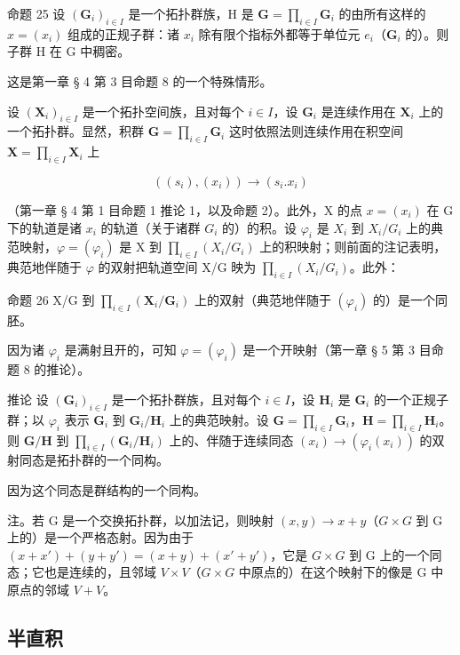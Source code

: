 命题 25 设 \((\mathbf{G}_{i})_{i\in I}\) 是一个拓扑群族，H 是 \(\mathbf{G} = \prod_{i\in I}\mathbf{G}_i\) 的由所有这样的 \(x = (x_{i})\) 组成的正规子群：诸 \(x_{i}\) 除有限个指标外都等于单位元 \(e_i\)（\(\mathbf{G}_i\) 的）。则子群 H 在 G 中稠密。

这是第一章 § 4 第 3 目命题 8 的一个特殊情形。

设 \((\mathbf{X}_i)_{i \in I}\) 是一个拓扑空间族，且对每个 \(i \in I\)，设 \(\mathbf{G}_i\) 是连续作用在 \(\mathbf{X}_i\) 上的一个拓扑群。显然，积群 \(\mathbf{G} = \prod_{i \in I} \mathbf{G}_i\) 这时依照法则连续作用在积空间 \(\mathbf{X} = \prod_{i \in I} \mathbf{X}_i\) 上

\[
\left(\left(s _ {i}\right), \left(x _ {i}\right)\right)\rightarrow \left(s _ {i}. x _ {i}\right)
\]

（第一章 § 4 第 1 目命题 1 推论 1，以及命题 2）。此外，X 的点 \(x = (x_{i})\) 在 G 下的轨道是诸 \(x_{i}\) 的轨道（关于诸群 \(G_{i}\) 的）的积。设 \(\varphi_{i}\) 是 \(X_{i}\) 到 \(X_{i}/G_{i}\) 上的典范映射，\(\varphi = (\varphi_{i})\) 是 X 到 \(\prod_{i\in I}(X_{i}/G_{i})\) 上的积映射；则前面的注记表明，典范地伴随于 \(\varphi\) 的双射把轨道空间 X/G 映为 \(\prod_{i\in I}(X_{i}/G_{i})\)。此外：

命题 26 X/G 到 \(\prod_{i\in I}(\mathbf{X}_i / \mathbf{G}_i)\) 上的双射（典范地伴随于 \((\varphi_i)\) 的）是一个同胚。

因为诸 \(\varphi_{i}\) 是满射且开的，可知 \(\varphi = (\varphi_{i})\) 是一个开映射（第一章 § 5 第 3 目命题 8 的推论）。

推论 设 \((\mathbf{G}_{i})_{i\in I}\) 是一个拓扑群族，且对每个 \(i\in I\)，设 \(\mathbf{H}_i\) 是 \(\mathbf{G}_i\) 的一个正规子群；以 \(\varphi_i\) 表示 \(\mathbf{G}_i\) 到 \(\mathbf{G}_i / \mathbf{H}_i\) 上的典范映射。设 \(\mathbf{G} = \prod_{i\in I}\mathbf{G}_i\)，\(\mathbf{H} = \prod_{i\in I}\mathbf{H}_i\)。则 \(\mathbf{G} / \mathbf{H}\) 到 \(\prod_{i\in I}(\mathbf{G}_i / \mathbf{H}_i)\) 上的、伴随于连续同态 \((x_i)\to (\varphi_i(x_i))\) 的双射同态是拓扑群的一个同构。

因为这个同态是群结构的一个同构。

注。若 G 是一个交换拓扑群，以加法记，则映射 \((x,y)\to x+y\)（\(G\times G\) 到 G 上的）是一个严格态射。因为由于 \((x+x')+(y+y')=(x+y)+(x'+y')\)，它是 \(G\times G\) 到 G 上的一个同态；它也是连续的，且邻域 \(V\times V\)（\(G\times G\) 中原点的）在这个映射下的像是 G 中原点的邻域 \(V+V\)。

\subsection{半直积}

